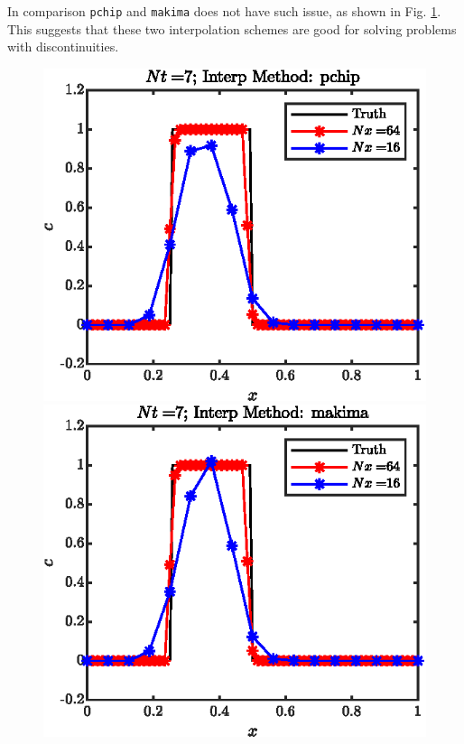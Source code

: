\documentclass[11pt,letterpaper]{article}
\begin{document}
In comparison \texttt{pchip} and \texttt{makima} does not have such issue, as shown in Fig. \ref{fig:1D_step_cons_pchip_sol}. This suggests that these two interpolation schemes are good for solving problems with discontinuities. 
\begin{figure}[H]
    \centering
    \includegraphics{figs/1D_step_cons_pchip_sol}
    \includegraphics{figs/1D_step_cons_makima_sol}
    \caption{}\label{fig:1D_step_cons_pchip_sol}
\end{figure}
\end{document}

